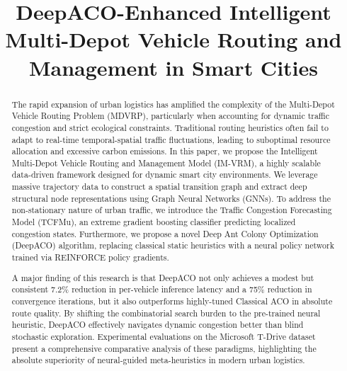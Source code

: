 \documentclass[conference]{IEEEtran}
\begin{document}
\title{DeepACO-Enhanced Intelligent Multi-Depot Vehicle Routing and Management in Smart Cities}

\author{
}

\maketitle

\begin{abstract}
The rapid expansion of urban logistics has amplified the complexity of the Multi-Depot Vehicle Routing Problem (MDVRP), particularly when accounting for dynamic traffic congestion and strict ecological constraints. Traditional routing heuristics often fail to adapt to real-time temporal-spatial traffic fluctuations, leading to suboptimal resource allocation and excessive carbon emissions. In this paper, we propose the Intelligent Multi-Depot Vehicle Routing and Management Model (IM-VRM), a highly scalable data-driven framework designed for dynamic smart city environments. We leverage massive trajectory data to construct a spatial transition graph and extract deep structural node representations using Graph Neural Networks (GNNs). To address the non-stationary nature of urban traffic, we introduce the Traffic Congestion Forecasting Model (TCFMu), an extreme gradient boosting classifier predicting localized congestion states. Furthermore, we propose a novel Deep Ant Colony Optimization (DeepACO) algorithm, replacing classical static heuristics with a neural policy network trained via REINFORCE policy gradients. 

A major finding of this research is that DeepACO not only achieves a modest but consistent 7.2\% reduction in per-vehicle inference latency and a 75\% reduction in convergence iterations, but it also outperforms highly-tuned Classical ACO in absolute route quality. By shifting the combinatorial search burden to the pre-trained neural heuristic, DeepACO effectively navigates dynamic congestion better than blind stochastic exploration. Experimental evaluations on the Microsoft T-Drive dataset present a comprehensive comparative analysis of these paradigms, highlighting the absolute superiority of neural-guided meta-heuristics in modern urban logistics.
\end{abstract}
\end{document}
